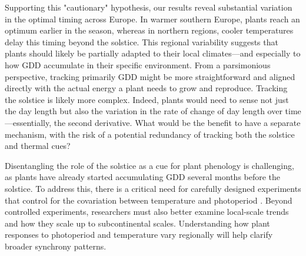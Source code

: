 \documentclass[11pt,letter]{article}
\begin{document}
Supporting this "cautionary" hypothesis, our results reveal substantial variation in the optimal timing across Europe. In warmer southern Europe, plants reach an optimum earlier in the season, whereas in northern regions, cooler temperatures delay this timing beyond the solstice. 
This regional variability suggests that plants should likely be partially adapted to their local climates---and especially to how GDD accumulate in their specific environment.
From a parsimonious perspective, tracking primarily GDD might be more straightforward and aligned directly with the actual energy a plant needs to grow and reproduce. %
Tracking the solstice is likely more complex. Indeed, plants would need to sense not just the day length but also the variation in the rate of change of day length over time---essentially, the second derivative.
What would be the benefit to have a separate mechanism, with the risk of a potential redundancy of tracking both the solstice and thermal cues?



Disentangling the role of the solstice as a cue for plant phenology is challenging, as plants have already started accumulating GDD several months before the solstice.
To address this, there is a critical need for carefully designed experiments that control for the covariation between temperature and photoperiod  \citep{Buonaiuto2023}.
Beyond controlled experiments, researchers must also better examine local-scale trends and how they scale up to subcontinental scales. Understanding how plant responses to photoperiod and temperature vary regionally will help clarify broader synchrony patterns.
\end{document}
